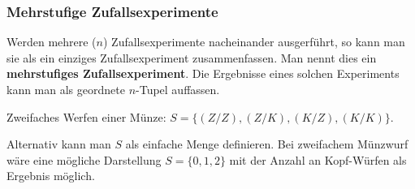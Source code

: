 \documentclass[../MAIN/main.tex]{subfiles}
\begin{document}
\subsubsection{Mehrstufige Zufallsexperimente}
\begin{Definition}
  Werden mehrere ($n$) Zufallsexperimente nacheinander ausgerführt, so kann man sie als ein einziges Zufallsexperiment zusammenfassen. Man nennt dies ein \textbf{mehrstufiges Zufallsexperiment}. Die Ergebnisse eines solchen Experiments kann man als geordnete $n$-Tupel auffassen.
\end{Definition}
\begin{Beispiel}
  Zweifaches Werfen einer Münze: $S=\{ (Z/Z),(Z/K),(K/Z),(K/K)\} $.\\
\end{Beispiel}
\begin{Bemerkung}
  Alternativ kann man $S$ als einfache Menge definieren. Bei zweifachem Münzwurf wäre eine mögliche Darstellung $S = \{ 0,1,2\}$ mit der Anzahl an Kopf-Würfen als Ergebnis möglich.
\end{Bemerkung}
\end{document}
